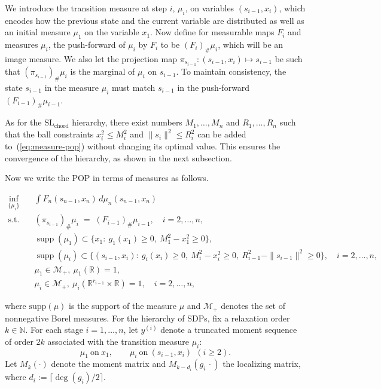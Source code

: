 \documentclass[11pt,a4paper]{article}
\newcommand{\R}{\mathbb R}
\theoremstyle{definition}
\begin{document}
We introduce the transition measure at step $i$, $\mu_i$, on variables $(s_{i-1},x_i)$, which encodes how the previous state and the current variable are distributed as well as an initial measure $\mu_1$ on the variable $x_1$. Now define for measurable maps $F_i$ and measures $\mu_i$, the push-forward of $\mu_i$ by $F_i$ to be $(F_i)_{\#}\mu_i$, which will be an image measure. We also let the projection map $\pi_{s_{i-1}}:(s_{i-1},x_i) \mapsto s_{i-1}$ be such that $(\pi_{s_{i-1}})_\#\mu_i$ is the marginal of $\mu_i$ on $s_{i-1}$. To maintain consistency, the state $s_{i-1}$ in the measure $\mu_i$ must match $s_{i-1}$ in the push-forward $(F_{i-1})_{\#}\mu_{i-1}$. 

As for the $\mathrm{SL}_{\mathrm{chord}}$ hierarchy, there exist numbers $M_1,\ldots,M_n$ and $R_1,\ldots,R_n$ such that the ball constraints $x_i^2 \le M_i^2$ and $\|s_i\|^2 \le R_i^2$ can be added to~(\ref{eq:measure-pop}) without changing its optimal value. This ensures the convergence of the hierarchy, as shown in the next subsection.

Now we write the POP in terms of measures as follows.

\begin{equation}\label{eq:measure-pop}
\begin{aligned}
\inf_{\{\mu_i\}} \quad
& \int F_n(s_{n-1},x_n) \, d\mu_n(s_{n-1},x_n)\\
\text{s.t.}\quad
& (\pi_{s_{i-1}})_\#\mu_i\;=\; (F_{i-1})_{\#}\mu_{i-1}, \quad i=2,\dots,n,\\
& \operatorname{supp}(\mu_1)\subset \{x_1:\ g_1(x_1)\ge 0,\ M_1^2-x_1^2\ge 0\},\\
& \operatorname{supp}(\mu_i)\subset \{(s_{i-1},x_i):\ g_i(x_i)\ge 0,\ M_i^2-x_i^2\ge 0,\ R_{i-1}^2-\|s_{i-1}\|^2\ge 0\},\quad i=2,\dots,n,\\
& \mu_1\in\mathcal{M}_+,\ \mu_1(\R)=1,   \\
& \mu_i\in\mathcal{M}_+,\ \mu_i(\R^{r_{i-1}}\times\R)=1, \quad i=2,\dots,n,
\end{aligned}
\end{equation}


where $\mathrm{supp}(\mu)$ is the support of the measure $\mu$ and $\mathcal{M}_+$ denotes the set of nonnegative Borel measures. For the hierarchy of SDPs, fix a relaxation order $k\in\mathbb{N}$.
For each stage $i=1,\dots,n$, let $y^{(i)}$ denote a truncated moment sequence of order $2k$
associated with the transition measure $\mu_i$:
\[
\mu_1 \ \text{on}\ x_1, 
\qquad 
\mu_i \ \text{on}\ (s_{i-1},x_i)\ \ (i\ge 2).
\]
Let $M_k(\cdot)$ denote the moment matrix and $M_{k-d_i}(g_i\,\cdot)$ the localizing matrix,
where $d_i:=\lceil \deg(g_i)/2\rceil$.
\end{document}
